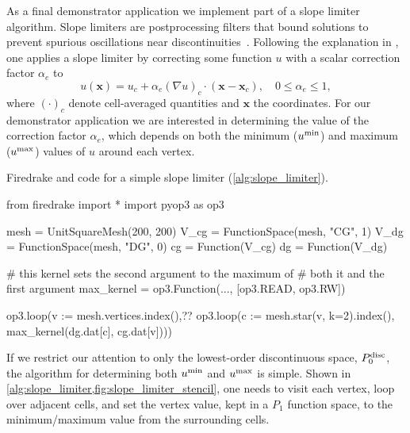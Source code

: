 \documentclass[thesis]{subfiles}
\begin{document}
As a final demonstrator application we implement part of a slope limiter algorithm.
Slope limiters are postprocessing filters that bound solutions to prevent spurious oscillations near discontinuities~\cite{biswasParallelAdaptiveFinite1994}.
Following the explanation in \cite{kuzminVertexbasedHierarchicalSlope2010}, one applies a slope limiter by correcting some function $u$ with a scalar correction factor $\alpha_e$ to
\begin{equation}
  u(\mathbf{x}) = u_c + \alpha_e(\nabla u)_c \cdot (\mathbf{x} - \mathbf{x}_c), \quad 0 \leq \alpha_e \leq 1 ,
\end{equation}
where $(\cdot)_c$ denote cell-averaged quantities and $\mathbf{x}$ the coordinates.
For our demonstrator application we are interested in determining the value of the correction factor $\alpha_e$, which depends on both the minimum ($u^{\textnormal{min}}$) and maximum ($u^{\textnormal{max}}$) values of $u$ around each vertex.

\begin{listing}
  \centering
  \caption{
    Firedrake and  code for a simple slope limiter (\cref{alg:slope_limiter}).
  }
  \begin{minipage}{.9\textwidth}
    \begin{pyalg2}
      from firedrake import *
      import pyop3 as op3

      mesh = UnitSquareMesh(200, 200)
      V_cg = FunctionSpace(mesh, "CG", 1)
      V_dg = FunctionSpace(mesh, "DG", 0)
      cg = Function(V_cg)
      dg = Function(V_dg)

      # this kernel sets the second argument to the maximum of
      # both it and the first argument
      max_kernel = op3.Function(..., [op3.READ, op3.RW])

      op3.loop(v := mesh.vertices.index(),?\label{code:slope_limiter_expr}?
               op3.loop(c := mesh.star(v, k=2).index(),
                        max_kernel(dg.dat[c], cg.dat[v])))
    \end{pyalg2}
  \end{minipage}
  \label{listing:app2_code}
\end{listing}

If we restrict our attention to only the lowest-order discontinuous space, $P_0^{\textnormal{disc}}$, the algorithm for determining both $u^{\textnormal{min}}$ and $u^{\textnormal{max}}$ is simple.
Shown in \cref{alg:slope_limiter,fig:slope_limiter_stencil}, one needs to visit each vertex, loop over adjacent cells, and set the vertex value, kept in a $P_1$ function space, to the minimum/maximum value from the surrounding cells.
\end{document}
